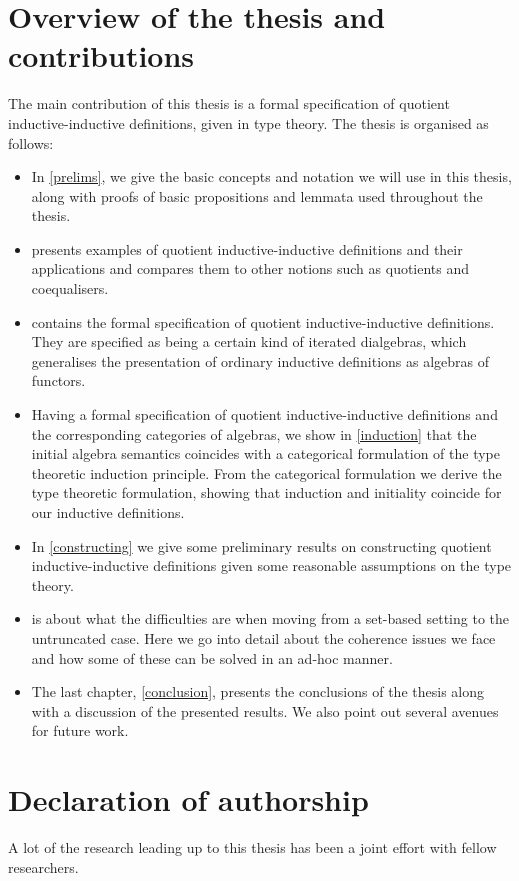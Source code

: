 \section{Overview of the thesis and contributions}

The main contribution of this thesis is a formal specification of
quotient inductive-inductive definitions, given in type theory. The
thesis is organised as follows:

\begin{itemize}
\item In \cref{prelims}, we give the basic concepts and notation we
  will use in this thesis, along with proofs of basic propositions and
  lemmata used throughout the thesis.
\item {} presents examples of quotient inductive-inductive
  definitions and their applications and compares them to other
  notions such as quotients and coequalisers.
\item {} contains the formal specification of quotient
  inductive-inductive definitions. They are specified as being a
  certain kind of iterated dialgebras, which generalises the
  presentation of ordinary inductive definitions as algebras of
  functors.
\item Having a formal specification of quotient inductive-inductive
  definitions and the corresponding categories of algebras, we show in
  \cref{induction} that the initial algebra semantics coincides with a
  categorical formulation of the type theoretic induction
  principle. From the categorical formulation we derive the type
  theoretic formulation, showing that induction and initiality
  coincide for our inductive definitions.
\item In \cref{constructing} we give some preliminary results on
  constructing quotient inductive-inductive definitions given some
  reasonable assumptions on the type theory.
\item {} is about what the difficulties are when
  moving from a set-based setting to the untruncated case. Here we go
  into detail about the coherence issues we face and how some of these
  can be solved in an ad-hoc manner.
\item The last chapter, \cref{conclusion}, presents the conclusions of
  the thesis along with a discussion of the presented results. We also
  point out several avenues for future work.
\end{itemize}

\section{Declaration of authorship}

A lot of the research leading up to this thesis has been a joint
effort with fellow researchers.

